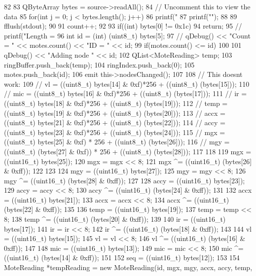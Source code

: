 \begin{DoxyCode}
82 {
83     QByteArray bytes = source->readAll();
84 // Uncomment this to view the data
85     for(int j = 0; j < bytes.length(); j++)
86         printf("%
87     printf("\n");
88 
89     fflush(stdout);
90 
91     count++;
92 
93     if((int) bytes[0] != 0x1c)
94         return;
95 //      printf("Length = %
96       int id = (int) (uint8_t) bytes[5];
97     //  qDebug() << "Count = " << motes.count() << "ID = " << id;
99       if(motes.count() <= id)
100       {
101           qDebug() << "Adding node " << id;
102           QList<MoteReading> temp;
103           ringBuffer.push_back(temp);
104           ringIndex.push_back(0);
105           motes.push_back(id);
106           emit this->nodesChanged();
107       }
108 // This doesnt work:
109 //      vl = ((uint8_t) bytes[14] & 0xf)*256  + ((uint8_t) (bytes[15]));
110 //      mic = ((uint8_t) bytes[16] & 0xf)*256 + ((uint8_t) (bytes[17]));
111 //      ir = ((uint8_t) bytes[18] & 0xf)*256 + ((uint8_t) (bytes[19]));
112 //      temp = ((uint8_t) bytes[19] & 0xf)*256 + ((uint8_t) (bytes[20]));
113 //      accx = ((uint8_t) bytes[21] & 0xf)*256  + ((uint8_t) (bytes[22]));
114 //      accy = ((uint8_t) bytes[23] & 0xf)*256 + ((uint8_t) (bytes[24]));
115 //      mgx = ((uint8_t) bytes[25] & 0xf) * 256 + ((uint8_t) (bytes[26]));
116 //      mgy = ((uint8_t) (bytes[27] & 0xf)) * 256 + ((uint8_t) (bytes[28]));
117 
118 
119       mgx = ((uint16_t) bytes[25]);
120       mgx = mgx << 8;
121       mgx ^= ((uint16_t) (bytes[26] & 0xff));
122 
123 
124       mgy = ((uint16_t) bytes[27]);
125       mgy = mgy << 8;
126       mgy ^= ((uint16_t) (bytes[28] & 0xff));
127 
128       accy = ((uint16_t) bytes[23]);
129       accy = accy << 8;
130       accy ^= ((uint16_t) (bytes[24] & 0xff));
131 
132       accx = ((uint16_t) bytes[21]);
133       accx = accx << 8;
134       accx ^= ((uint16_t) (bytes[22] & 0xff));
135 
136       temp = ((uint16_t) bytes[19]);
137       temp = temp << 8;
138       temp ^= ((uint16_t) (bytes[20] & 0xff));
139 
140       ir = ((uint16_t) bytes[17]);
141       ir = ir << 8;
142       ir ^= ((uint16_t) (bytes[18] & 0xff));
143 
144       vl = ((uint16_t) bytes[15]);
145       vl = vl << 8;
146       vl ^= ((uint16_t) (bytes[16] & 0xff));
147 
148       mic = ((uint16_t) bytes[13]);
149       mic = mic << 8;
150       mic ^= ((uint16_t) (bytes[14] & 0xff));
151 
152       seq = ((uint16_t) bytes[12]);
153 
154       MoteReading *tempReading = new MoteReading(id, mgx, mgy, accx, accy, temp, 
}
\end{DoxyCode}
